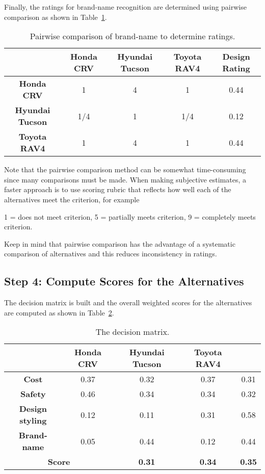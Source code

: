 Finally, the ratings for brand-name recognition are determined using
pairwise comparison as shown in Table~\ref{table:pairwiseCompareNameRatings}.


\begin{table}[h]
\caption{Pairwise comparison of brand-name to determine ratings.}
\label{table:pairwiseCompareNameRatings}

\begin{tabular}{|c|c|c|c|c|}
\hline
\rowcolor{Gray}
			 & \textbf{Honda CRV}  & \textbf{Hyundai Tucson} & \textbf{Toyota RAV4} & \textbf{Design Rating}\\ \hline

\textbf{Honda CRV} 			& 1 & 4 & 1 & 0.44 \\ \hline
\textbf{Hyundai Tucson} 	& 1/4 & 1 & 1/4 & 0.12 \\ \hline
\textbf{Toyota RAV4}		& 1 & 4 & 1 & 0.44 \\ \hline
\end{tabular}
\end{table}


Note that the pairwise comparison method can be somewhat time-consuming
since many comparisons must be made. When making subjective estimates, a
faster approach is to use scoring rubric that reflects how well each of
the alternatives meet the criterion, for example

1 = does not meet criterion, 5 = partially meets criterion, 9 = completely meets criterion.

Keep in mind that pairwise comparison has the advantage of a systematic
comparison of alternatives and this reduces inconsistency in ratings.

\subsection*{Step 4: Compute Scores for the Alternatives}

The decision matrix is built and the overall weighted scores for the
alternatives are computed as shown in Table~\ref{table:decisionMatrix}.

\begin{table}[h]
\caption{The decision matrix.}
\label{table:decisionMatrix}

\begin{tabular}{|c|c|c|c|c|}
\hline
\rowcolor{Gray}
\multicolumn{2}{|c|}{}	 & \textbf{Honda CRV}  & \textbf{Hyundai Tucson} & \textbf{Toyota RAV4} \\ \hline
\textbf{Cost} & 0.37 & 0.32 & 0.37 & 0.31 \\ \hline
\textbf{Safety} & 0.46 & 0.34 & 0.34 & 0.32 \\ \hline
\textbf{Design styling} & 0.12 & 0.11 & 0.31 & 0.58 \\ \hline
\textbf{Brand-name} & 0.05 & 0.44 & 0.12 & 0.44 \\ \hline
\multicolumn{2}{|c|}{\textbf{Score}}	&  \textbf{0.31} & \textbf{0.34} & \textbf{0.35} \\ \hline
\end{tabular}
\end{table}

